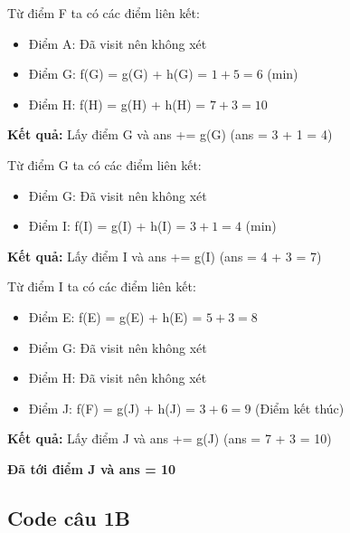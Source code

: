 \documentclass{article}
\begin{document}
Từ điểm F ta có các điểm liên kết:
\begin{itemize}
    \item Điểm A: Đã visit nên không xét
    \item Điểm G: f(G) = g(G) + h(G) = $1 + 5 = 6$ (min)
    \item Điểm H: f(H) = g(H) + h(H) = $7 + 3 = 10$
\end{itemize}
\textbf{Kết quả:} Lấy điểm G và ans += g(G) (ans = 3 + 1 = 4)
\vspace{10pt}

Từ điểm G ta có các điểm liên kết:
\begin{itemize}
    \item Điểm G: Đã visit nên không xét
    \item Điểm I: f(I) = g(I) + h(I) = $3 + 1 = 4$ (min)
\end{itemize}
\textbf{Kết quả:} Lấy điểm I và ans += g(I) (ans = 4 + 3 = 7)
\vspace{10pt}

Từ điểm I ta có các điểm liên kết:
\begin{itemize}
    \item Điểm E: f(E) = g(E) + h(E) = $5 + 3 = 8$
    \item Điểm G: Đã visit nên không xét
    \item Điểm H: Đã visit nên không xét
    \item Điểm J: f(F) = g(J) + h(J) = $3 + 6 = 9$ (Điểm kết thúc)
\end{itemize}
\textbf{Kết quả:} Lấy điểm J và ans += g(J) (ans = 7 + 3 = 10)
\vspace{10pt}

\textbf{Đã tới điểm J và ans = 10}
\vspace{10pt}

\subsection{Code câu 1B}
\vspace{10pt}
\end{document}
